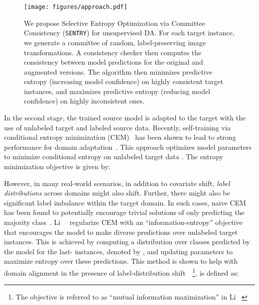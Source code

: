 \documentclass[10pt,twocolumn,letterpaper]{article}
\newcommand{\method}{\texttt{SENTRY}\xspace}
\begin{document}
\begin{figure*}[t]
    \centering
    \vspace{-2pt}
    \texttt{[image: figures/approach.pdf]}
    \vspace{-12pt}
    \caption{
    We propose Selective Entropy Optimization via Committee Consistency (\method) for unsupervised DA. For each target instance, we generate a committee of random, label-preserving image transformations. A consistency checker then computes the consistency between model predictions for the original and augmented versions. The algorithm then minimizes predictive entropy (increasing model confidence) on highly consistent target instances, and maximizes predictive entropy (reducing model confidence) on highly inconsistent ones.
    }
    \label{fig:approach}
    \vspace*{-10pt}
 \end{figure*}

In the second stage, the trained source model is adapted to the target with the use of unlabeled target and labeled source data. 
Recently, self-training via conditional entropy minimization (CEM)~\cite{grandvalet2005semi} has been shown to lead to strong performance for domain adaptation~\cite{saito2019semi}. This approach optimizes model parameters to minimize conditional entropy on unlabeled target data . The entropy minimization objective  is given by:

However, in many real-world scenarios, in addition to covariate shift, \emph{label distributions} across domains might also shift. Further, there might also be significant label imbalance within the target domain. In such cases, naive CEM has been found to potentially encourage trivial solutions of only predicting the majority class~\cite{li2020rethinking}. Li~\etal~\cite{li2020rethinking} regularize CEM with an ``information-entropy'' objective  that encourages the model to make diverse predictions over unlabeled target instances. This is achieved by computing a distribution over classes predicted by the model for the last- instances, denoted by , and updating parameters to maximize entropy over these predictions. This method is shown to help with domain alignment in the presence of label-distribution shift~\cite{li2020rethinking}~\footnote{The objective is referred to as ``mutual information maximization'' in Li \etal~\cite{li2020rethinking}}.  is defined as:

\vspace{-5pt}
\end{document}

